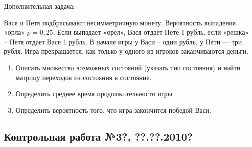 \documentclass[12pt, a4paper]{article}\usepackage[]{graphicx}\usepackage[]{color}
\begin{document}
	Дополнительная задача:

	Вася и Петя подбрасывают несимметричную монету. Вероятность выпадения «орла» $p=0,25$. Если выпадает «орел», Вася отдает Пете 1 рубль, если «решка» -- Петя отдает Васе 1 рубль. В начале игры у Васи -- один рубль, у Пети — три рубля. Игра прекращается, как только у одного из игроков заканчиваются деньги.
	\begin{enumerate}
		\item Описать множество возможных состояний (указать тип состояния) и найти матрицу переходов из состояния в состояние.
		\item Определить среднее время продолжительности игры
		\item Определить вероятность того, что игра закончится победой Васи.
	\end{enumerate}

	\subsection{Контрольная работа №3?, ??.??.2010?}
\end{document}
